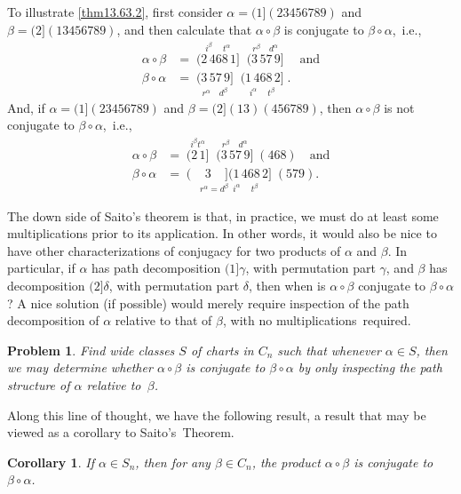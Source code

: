 \documentclass{surv-l}
\numberwithin{equation}{section}
\numberwithin{table}{section}
\numberwithin{figure}{section}
\newtheorem{corollary}[equation]{Corollary}
\newtheorem{problem}[equation]{Problem}
\theoremstyle{definition}
\begin{document}
To illustrate \ref{thm13.63.2}, first consider
$\alpha=(1](23456789)$ and $\beta=(2](13456789)$, and then
calculate that $\alpha \circ\beta$ is conjugate to
$\beta\circ\alpha$,~i.e.,
\begin{align*}
\alpha\circ\beta &= \mathop{(2\,468\,1]}\limits^{i^{\beta}\quad\ t^{\alpha}} \mathop{(3\,57\,9]}\limits^{r^{\beta}\quad d^{\alpha}}\quad \mathrm{and}\\
\beta \circ\alpha &=\mathop{(3\,57\,9]}\limits_{{r^{\alpha} \quad d^{\beta}}} \mathop{(1\,468\,2]}\limits_{i^{\alpha}\quad\ t^{\beta}}.
\end{align*}
And, if $\alpha=(1](23456789)$ and $\beta=(2](13)(456789)$, then
$\alpha \circ\beta$ is not conjugate to $\beta \circ\alpha$,~i.e.,
\begin{align*}
\alpha\circ\beta &= \mathop{(2\,1]}\limits^{{i^{\beta}t^{\alpha}}} \mathop{(3\,57\,9]}\limits^{r^{\beta}\quad d^{\alpha}}(468)\quad \mathrm{and}\\
\beta \circ\alpha &=\mathop{(\quad 3\quad](1\,468\,2]}\limits_{r^{\alpha}=d^{\beta}\enspace i^{\alpha}\quad\ t^{\beta}}(579).
\end{align*}

The down side of Saito's theorem is that,
in practice, we must do at least some multiplications prior to its
application. In other words, it would also be nice to have other
characterizations of conjugacy for two products of $\alpha$ and
$\beta$. In particular, if $\alpha$ has path decomposition
$(1]\gamma$, with permutation part $\gamma$, and $\beta$ has
decomposition $(2]\delta$, with permutation part $\delta$, then
when is $\alpha \circ\beta$ conjugate to $\beta \circ\alpha$? A
nice solution (if possible) would merely require inspection of the
path decomposition of $\alpha$ relative to that of $\beta$, with
no multiplications~required.

\begin{problem}\label{prob13.63.3}
Find wide classes $S$ of charts in $C_{n}$ such that whenever
$\alpha\in S$, then we may determine whether $\alpha
\circ\beta$ is conjugate to $\beta \circ\alpha$ by only
inspecting the path structure of $\alpha$ relative to~$\beta$.
\end{problem}

Along this line of thought, we have the following result, a result
that may be viewed as a corollary to Saito's~Theorem.

\begin{corollary}\label{cor13.63.4}
If $\alpha\in S_{n}$, then for any $\beta\in C_{n}$, the
product $\alpha \circ\beta$ is conjugate to $\beta
\circ\alpha$.
\end{corollary}
\end{document}
